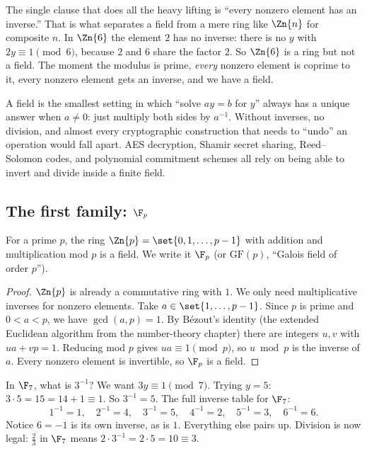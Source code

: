 The single clause that does all the heavy lifting is ``every nonzero element
has an inverse.'' That is what separates a field from a mere ring like
$\Zn{n}$ for composite $n$. In $\Zn{6}$ the element $2$ has no inverse: there
is no $y$ with $2y \equiv 1 \pmod 6$, because $2$ and $6$ share the factor
$2$. So $\Zn{6}$ is a ring but not a field. The moment the modulus is prime,
\emph{every} nonzero element is coprime to it, every nonzero element gets an
inverse, and we have a field.

\begin{intuitionbox}
A field is the smallest setting in which ``solve $ay = b$ for $y$'' always
has a unique answer when $a \neq 0$: just multiply both sides by $a^{-1}$.
Without inverses, no division, and almost every cryptographic construction
that needs to ``undo'' an operation would fall apart. AES decryption, Shamir
secret sharing, Reed--Solomon codes, and polynomial commitment schemes all
rely on being able to invert and divide inside a finite field.
\end{intuitionbox}

\subsection{The first family: $\F_p$}

\begin{theorem}
\label{ch06:thm-fp}
For a prime $p$, the ring $\Zn{p} = \set{0,1,\dots,p-1}$ with addition and
multiplication mod $p$ is a field. We write it $\F_p$ (or $\mathrm{GF}(p)$,
``Galois field of order $p$'').
\end{theorem}

\begin{proof}
$\Zn{p}$ is already a commutative ring with $1$. We only need multiplicative
inverses for nonzero elements. Take $a \in \set{1,\dots,p-1}$. Since $p$ is
prime and $0 < a < p$, we have $\gcd(a,p)=1$. By B\'ezout's identity (the
extended Euclidean algorithm from the number-theory chapter) there are
integers $u,v$ with $ua + vp = 1$. Reducing mod $p$ gives $ua \equiv 1
\pmod p$, so $u \bmod p$ is the inverse of $a$. Every nonzero element is
invertible, so $\F_p$ is a field.
\end{proof}

\begin{example}[Inverses in $\F_7$]
\label{ch06:ex-f7}
In $\F_7$, what is $3^{-1}$? We want $3y \equiv 1 \pmod 7$. Trying
$y=5$: $3\cdot 5 = 15 = 14 + 1 \equiv 1$. So $3^{-1} = 5$. The full inverse
table for $\F_7$:
\[
1^{-1}=1,\quad 2^{-1}=4,\quad 3^{-1}=5,\quad 4^{-1}=2,\quad 5^{-1}=3,\quad
6^{-1}=6.
\]
Notice $6 = -1$ is its own inverse, as is $1$. Everything else pairs up.
Division is now legal: $\tfrac{2}{3}$ in $\F_7$ means $2 \cdot 3^{-1} = 2
\cdot 5 = 10 \equiv 3$.
\end{example}

